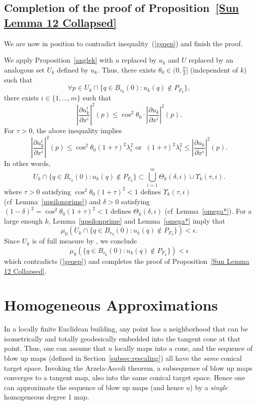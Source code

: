 \documentclass[12pt]{amsart}
\theoremstyle{definition}
\numberwithin{equation}{section}
\newcommand{\B}{B}
\newcommand{\PFk}{P_{F_k}}
\begin{document}
\subsection{Completion of the proof of Proposition~\ref{Sun Lemma 12 Collapsed}} \label{subsec:SunCollapsed}



 We are now in position to contradict inequality~(\ref{geqep}) and finish the proof.

We apply Proposition~\ref{anglek} with $u$ replaced by  $u_k$ and $U$ replaced by an analogous set $U_k$ defined by $u_k$.  Thus, there exists $\theta_0 \in (0,\frac{\pi}{2}]$ (independent of $k$) such that  
$$
\forall p \in U_k \cap \{q \in \B_{r_0}(0): u_k(q) \not \in \PFk\},$$ 
there exists  $i  \in \{1, \dots, m\}$ such that 
\[
 \left|\frac{\partial u_k^i}{\partial x^i} \right|^2(p) \leq \cos^2 \theta_0  \cdot  \left|\frac{\partial u_k}{\partial x^i} \right|^2(p).
\]
For $\tau>0$,  the above inequality implies
\[
 \left|\frac{\partial u_k^i}{\partial x^i} \right|^2 (p)\leq   \cos^2 \theta_0   (1+\tau)^2  \lambda_i^2 \mbox{ \ or \ } \ (1+\tau)^2 \lambda_i^2   \leq   \left|\frac{\partial u_k}{\partial x^i} \right|^2(p).
 \]
In other words, 
\[
U_k \cap \{q \in \B_{r_0}(0): u_k(q) \not \in \PFk \} \subset \bigcup_{i=1}^m \Theta_k (\delta, i) \cup \Upsilon_k(\tau, i).
\]
where $\tau>0$ satisfying $\cos^2 \theta_0 (1+\tau)^2<1$ defines $\Upsilon_k(\tau, i)$ (cf~Lemma~\ref{upsilonprime}) and   $\delta>0$  satisfying $(1-\delta)^2=\cos^2 \theta_0 (1+\tau)^2<1$ defines $\Theta_k(\delta, i)$ (cf~Lemma~\ref{omega*}). 
For a large enough $k$, Lemma~\ref{upsilonprime} and Lemma~\ref{omega*}  imply that
$$
\mu_0\left(U_k \cap \{q \in \B_{r_0}(0): u_k(q) \not \in \PFk\} \right)<\epsilon.
$$
Since $U_k$ is of full measure by \cite[Theorem 1.6]{lytchak}, we conclude 
 \[
 \mu_0\left( \{q \in B_{r_0}(0):u_k(q) \notin \PFk\}\right)<\epsilon
 \]
which  contradicts (\ref{geqep}) and completes the proof of Proposition~\ref{Sun Lemma 12 Collapsed}.

\section{Homogeneous Approximations}\label{sec:approx}
 In a locally finite Euclidean building, any point has a neighborhood that can be isometrically and totally geodesically embedded into the tangent cone at that point. Thus, one can assume that $u$ locally maps into a cone, and  the sequence of blow up maps (defined in Section~\ref{subsec:rescaling}) all have the {\it same} conical target space.  Invoking the Arzela-Ascoli theorem, a subsequence of blow up maps converges to a tangent map, also into the same conical target space. Hence one can approximate the sequence of  blow up maps (and hence $u$) by a  {\it single} homogeneous degree 1 map. 
\end{document}
